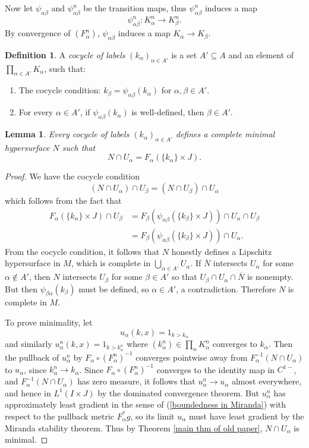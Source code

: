\documentclass[final,12pt, leqno]{brownthesis}
\newcommand{\dfn}[1]{\emph{#1}\index{#1}}
\newtheorem{lemma}[theorem]{Lemma}
\theoremstyle{definition}
\newtheorem{definition}[theorem]{Definition}
\numberwithin{equation}{section}
\begin{document}
Now let $\psi_{\alpha \beta}$ and $\psi_{\alpha \beta}^n$ be the transition maps, thus $\psi_{\alpha \beta}^n$ induces a map
$$\psi_{\alpha \beta}^n: K_\alpha^n \to K_\beta^n.$$
By convergence of $(F_\alpha^n)$, $\psi_{\alpha \beta}$ induces a map $K_\alpha \to K_\beta$.

\begin{definition}
	A \dfn{cocycle of labels} $(k_\alpha)_{\alpha \in A'}$ is a set $A' \subseteq A$ and an element of $\prod_{\alpha \in A'} K_\alpha$, such that:
\begin{enumerate}
	\item The cocycle condition: $k_\beta = \psi_{\alpha \beta}(k_\alpha)$ for $\alpha, \beta \in A'$.
	\item For every $\alpha \in A'$, if $\psi_{\alpha \beta}(k_\alpha)$ is well-defined, then $\beta \in A'$.
\end{enumerate}
\end{definition}

\begin{lemma}
	Every cocycle of labels $(k_\alpha)_{\alpha \in A'}$ defines a complete minimal hypersurface $N$ such that
	$$N \cap U_\alpha = F_\alpha(\{k_\alpha\} \times J).$$
\end{lemma}
\begin{proof}
We have the cocycle condition
$$(N \cap U_\alpha) \cap U_\beta = (N \cap U_\beta) \cap U_\alpha$$
which follows from the fact that
\begin{align*}
F_\alpha(\{k_\alpha\} \times J) \cap U_\beta
&= F_\beta(\psi_{\alpha \beta}(\{k_\beta\} \times J)) \cap U_\alpha \cap U_\beta \\
&= F_\beta(\psi_{\alpha \beta}(\{k_\beta\} \times J)) \cap U_\alpha.
\end{align*}
From the cocycle condition, it follows that $N$ honestly defines a Lipschitz hypersurface in $M$, which is complete in $\bigcup_{\alpha \in A'} U_\alpha$.
If $\overline N$ intersects $U_\alpha$ for some $\alpha \notin A'$, then $N$ intersects $U_\beta$ for some $\beta \in A'$ so that $U_\beta \cap U_\alpha \cap \overline N$ is nonempty.
But then $\psi_{\beta \alpha}(k_\beta)$ must be defined, so $\alpha \in A'$, a contradiction.
Therefore $N$ is complete in $M$.

To prove minimality, let
$$u_\alpha(k, x) = 1_{k > k_\alpha}$$
and similarly $u_\alpha^n(k, x) = 1_{k > k_\alpha^n}$ where $(k_\alpha^n) \in \prod_n K_\alpha^n$ converges to $k_\alpha$.
Then the pullback of $u_\alpha^n$ by $F_\alpha \circ (F_\alpha^n)^{-1}$ converges pointwise away from $F_\alpha^{-1}(N \cap U_\alpha)$ to $u_\alpha$, since $k_\alpha^n \to k_\alpha$.
Since $F_\alpha \circ (F_\alpha^n)^{-1}$ converges to the identity map in $C^{1-}$, and $F_\alpha^{-1}(N \cap U_\alpha)$ has zero measure, it follows that $u_\alpha^n \to u_\alpha$ almost everywhere, and hence in $L^1(I \times J)$ by the dominated convergence theorem.
But $u_\alpha^n$ has approximately least gradient in the sense of (\ref{boundedness in Miranda}) with respect to the pullback metric $F_\alpha^* g$, so its limit $u_\alpha$ must have least gradient by the Miranda stability theorem.
Thus by Theorem \ref{main thm of old paper}, $N \cap U_\alpha$ is minimal.
\end{proof}
\end{document}
